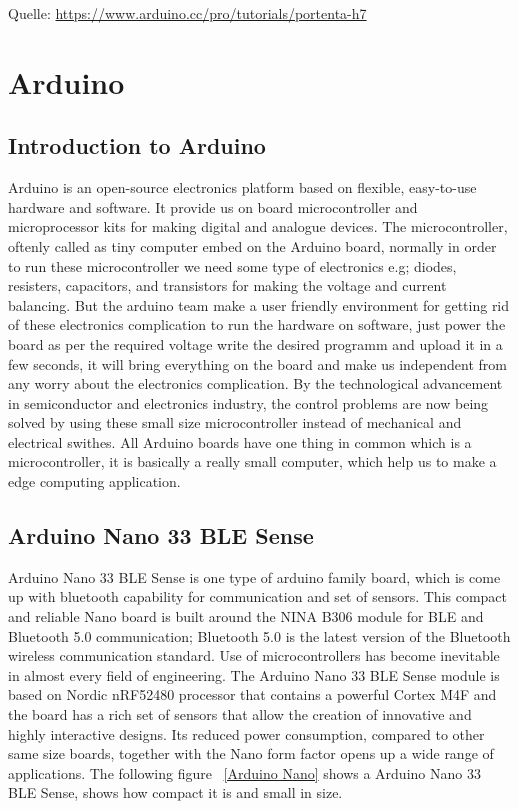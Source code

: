 %
%

{\tiny Quelle: \url{https://www.arduino.cc/pro/tutorials/portenta-h7}}


\chapter{Arduino}

\section{Introduction to Arduino}
Arduino is an open-source electronics platform based on flexible, easy-to-use hardware and software. It provide us on board microcontroller and microprocessor kits for making digital and analogue devices. The microcontroller, oftenly called as tiny computer embed on the Arduino board, normally in order to run these microcontroller we need some type of electronics e.g; diodes, resisters, capacitors, and transistors for making the voltage and current balancing. But the arduino team make a user friendly environment for getting rid of these electronics complication to run the hardware on software, just power the board as per the required voltage write the desired programm and upload it in a few seconds, it will bring everything on the board and  make us independent from any worry about the electronics complication. By the technological advancement in semiconductor and electronics  industry, the  control problems are now being solved by using these small size microcontroller instead of mechanical and electrical swithes. All Arduino boards have one thing in common which is a microcontroller, it is basically a really small computer, which help us to make a edge computing application.%

\section{Arduino Nano 33 BLE Sense}


Arduino Nano 33 BLE Sense is one type of arduino family board, which is come up with bluetooth capability for communication and set of sensors. This compact and reliable Nano board is built around the NINA B306 module for BLE and Bluetooth 5.0 communication; Bluetooth 5.0 is the latest version of the Bluetooth wireless communication standard. Use of microcontrollers has become inevitable in almost every field of engineering.  The Arduino Nano 33 BLE Sense module is based on Nordic nRF52480 processor that contains a powerful Cortex M4F and the board has a rich set of sensors that allow the creation of innovative and highly interactive designs. Its reduced power consumption, compared to other same size boards, together with the Nano form factor opens up a wide range of applications. The following figure ~\ref{Arduino Nano} shows a Arduino Nano 33 BLE Sense, shows how compact it is and small in size.

